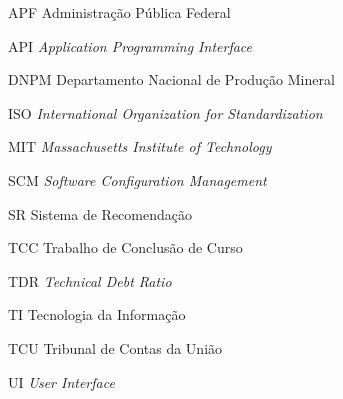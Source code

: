 \begin{siglas}
 \item[APF] Administração Pública Federal
 \item[API] \textit{Application Programming Interface}
 \item [DNPM] Departamento Nacional de Produção Mineral 
 \item[ISO] \textit{International Organization for Standardization}
 \item[MIT] \textit{Massachusetts Institute of Technology}
 \item [SCM] \textit{Software Configuration Management}
 \item [SR] Sistema de Recomendação
 \item [TCC] Trabalho de Conclusão de Curso
 \item[TDR] \textit{Technical Debt Ratio}
 \item[TI] Tecnologia da Informação 
 \item[TCU] Tribunal de Contas da União
 \item [UI] \textit{User Interface}
\end{siglas}
